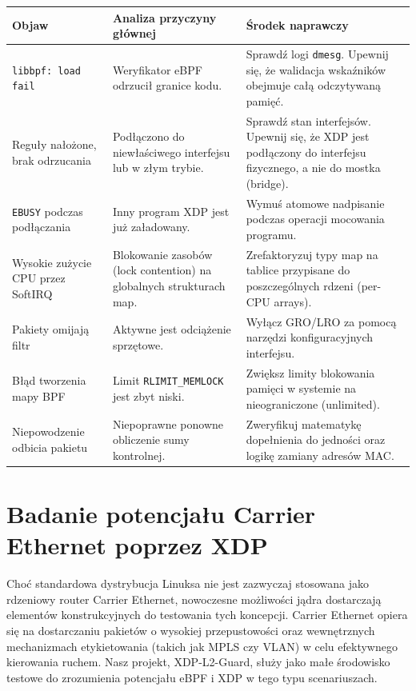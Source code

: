 \documentclass[11pt,a4paper]{article}
\begin{document}
\begin{center}
\renewcommand{\arraystretch}{1.5} %
\begin{tabular}{|p{}|p{}|p{}|}
\hline
\textbf{Objaw} & \textbf{Analiza przyczyny głównej} & \textbf{Środek naprawczy} \\ \hline
\texttt{libbpf: load fail} & Weryfikator eBPF odrzucił granice kodu. & Sprawdź logi \texttt{dmesg}. Upewnij się, że walidacja wskaźników obejmuje całą odczytywaną pamięć. \\ \hline
Reguły nałożone, brak odrzucania & Podłączono do niewłaściwego interfejsu lub w złym trybie. & Sprawdź stan interfejsów. Upewnij się, że XDP jest podłączony do interfejsu fizycznego, a nie do mostka (bridge). \\ \hline
\texttt{EBUSY} podczas podłączania & Inny program XDP jest już załadowany. & Wymuś atomowe nadpisanie podczas operacji mocowania programu. \\ \hline
Wysokie zużycie CPU przez SoftIRQ & Blokowanie zasobów (lock contention) na globalnych strukturach map. & Zrefaktoryzuj typy map na tablice przypisane do poszczególnych rdzeni (per-CPU arrays). \\ \hline
Pakiety omijają filtr & Aktywne jest odciążenie sprzętowe. & Wyłącz GRO/LRO za pomocą narzędzi konfiguracyjnych interfejsu. \\ \hline
Błąd tworzenia mapy BPF & Limit \texttt{RLIMIT\_MEMLOCK} jest zbyt niski. & Zwiększ limity blokowania pamięci w systemie na nieograniczone (unlimited). \\ \hline
Niepowodzenie odbicia pakietu & Niepoprawne ponowne obliczenie sumy kontrolnej. & Zweryfikuj matematykę dopełnienia do jedności oraz logikę zamiany adresów MAC. \\ \hline
\end{tabular}
\end{center}

\section{Badanie potencjału Carrier Ethernet poprzez XDP}

Choć standardowa dystrybucja Linuksa nie jest zazwyczaj stosowana jako rdzeniowy router Carrier Ethernet, nowoczesne możliwości jądra dostarczają elementów konstrukcyjnych do testowania tych koncepcji. Carrier Ethernet opiera się na dostarczaniu pakietów o wysokiej przepustowości oraz wewnętrznych mechanizmach etykietowania (takich jak MPLS czy VLAN) w celu efektywnego kierowania ruchem. Nasz projekt, XDP-L2-Guard, służy jako małe środowisko testowe do zrozumienia potencjału eBPF i XDP w tego typu scenariuszach.
\end{document}
